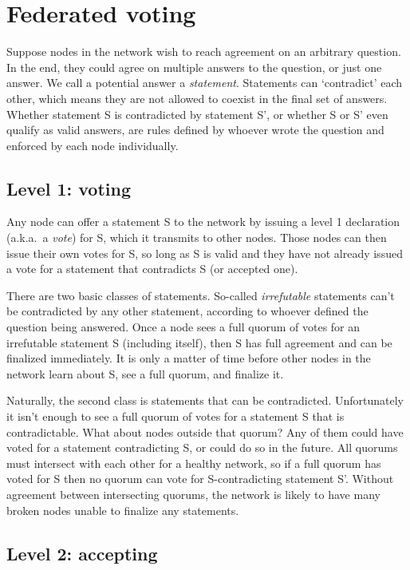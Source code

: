 \section{Federated voting}
\label{sec:consensus-federated-voting}

Suppose nodes in the network wish to reach agreement on an arbitrary question. In the end, they could agree on multiple answers to the question, or just one answer. We call a potential answer a {\em statement}. Statements can `contradict' each other, which means they are not allowed to coexist in the final set of answers. Whether statement S is contradicted by statement S', or whether S or S' even qualify as valid answers, are rules defined by whoever wrote the question and enforced by each node individually.


\subsection{Level 1: voting}
\label{subsec:consensus-lv1-voting}

Any node can offer a statement S to the network by issuing a level 1 declaration (a.k.a.\ a {\em vote}) for S, which it transmits to other nodes. Those nodes can then issue their own votes for S, so long as S is valid and they have not already issued a vote for a statement that contradicts S (or accepted one).

There are two basic classes of statements. So-called {\em irrefutable} statements can't be contradicted by any other statement, according to whoever defined the question being answered. Once a node sees a full quorum of votes for an irrefutable statement S (including itself), then S has full agreement and can be finalized immediately. It is only a matter of time before other nodes in the network learn about S, see a full quorum, and finalize it.

Naturally, the second class is statements that can be contradicted. Unfortunately it isn't enough to see a full quorum of votes for a statement S that is contradictable. What about nodes outside that quorum? Any of them could have voted for a statement contradicting S, or could do so in the future. All quorums must intersect with each other for a healthy network, so if a full quorum has voted for S then no quorum can vote for S-contradicting statement S'. Without agreement between intersecting quorums, the network is likely to have many broken nodes unable to finalize any statements.

\subsection{Level 2: accepting}
\label{subsec:consensus-lv2-accepting}

